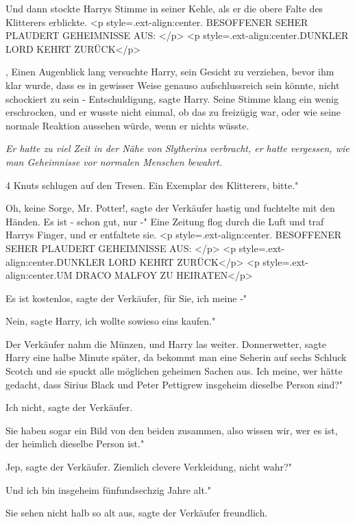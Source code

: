 Und dann stockte Harrys Stimme in seiner Kehle, als er die obere Falte des
Klitterers erblickte. <p style=\grqq{}.ext-align:center\grqq{}. BESOFFENER SEHER
PLAUDERT GEHEIMNISSE AUS: </p> <p style=\grqq{}.ext-align:center\grqq{}.DUNKLER
LORD KEHRT ZURÜCK</p>

, Einen Augenblick lang versuchte Harry, sein Gesicht zu verziehen, bevor ihm
klar wurde, dass es in gewisser Weise genauso aufschlussreich sein könnte, nicht
schockiert zu sein - \glqq Entschuldigung\grqq{}, sagte Harry. Seine Stimme
klang ein wenig erschrocken, und er wusste nicht einmal, ob das zu freizügig
war, oder wie seine normale Reaktion aussehen würde, wenn er nichts wüsste.

\emph{Er hatte zu viel Zeit in der Nähe von Slytherins verbracht, er hatte
vergessen, wie man Geheimnisse vor normalen Menschen bewahrt.}

4 Knuts schlugen auf den Tresen. \glqq Ein Exemplar des Klitterers, bitte."

\glqq Oh, keine Sorge, Mr. Potter!\grqq{}, sagte der Verkäufer hastig und
fuchtelte mit den Händen. \glqq Es ist - schon gut, nur -" Eine Zeitung flog
durch die Luft und traf Harrys Finger, und er entfaltete sie. <p
style=\grqq{}.ext-align:center\grqq{}. BESOFFENER SEHER PLAUDERT GEHEIMNISSE
AUS: </p> <p style=\grqq{}.ext-align:center\grqq{}.DUNKLER LORD KEHRT ZURÜCK</p>
<p style=\grqq{}.ext-align:center\grqq{}.UM DRACO MALFOY ZU HEIRATEN</p>

\glqq Es ist kostenlos\grqq{}, sagte der Verkäufer, \glqq für Sie, ich meine -"

\glqq Nein\grqq{}, sagte Harry, \glqq ich wollte sowieso eins kaufen."

Der Verkäufer nahm die Münzen, und Harry las weiter. \glqq Donnerwetter\grqq{},
sagte Harry eine halbe Minute später, \glqq da bekommt man eine Seherin auf
sechs Schluck Scotch und sie spuckt alle möglichen geheimen Sachen aus. Ich
meine, wer hätte gedacht, dass Sirius Black und Peter Pettigrew insgeheim
dieselbe Person sind?"

\glqq Ich nicht\grqq{}, sagte der Verkäufer.

\glqq Sie haben sogar ein Bild von den beiden zusammen, also wissen wir, wer es
ist, der heimlich dieselbe Person ist."

\glqq Jep\grqq{}, sagte der Verkäufer. \glqq Ziemlich clevere Verkleidung, nicht
wahr?"

\glqq Und ich bin insgeheim fünfundsechzig Jahre alt."

\glqq Sie sehen nicht halb so alt aus\grqq{}, sagte der Verkäufer freundlich.

